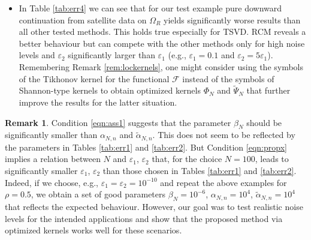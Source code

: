 \documentclass[a4paper, 10pt]{article}
\numberwithin{equation}{section}
\theoremstyle{definition}
\newtheorem{rem}[thm]{Remark}
\newcommand{\eps}{\ensuremath{\varepsilon}}
\begin{document}
\begin{itemize}
\item[(5)] In Table \ref{tab:err4} we can see that for our test example pure downward continuation from satellite data on $\Omega_R$ yields significantly worse results than all other tested methods. This holds true especially for TSVD. RCM reveals a better behaviour but can compete with the other methods only for high noise levels and $\eps_2$  significantly larger than $\eps_1$ (e.g., $\eps_1=0.1$ and $\eps_2=5\eps_1$). Remembering Remark \ref{rem:lockernels}, one might consider using the symbols of the Tikhonov kernel for the functional $\mathcal{F}$ instead of the symbols of Shannon-type kernels to obtain optimized kernels $\Phi_N$ and $\tilde{\Psi}_N$ that further improve the results for the latter situation.
\end{itemize}

\begin{rem}
Condition \eqref{eqn:ass1} suggests that the parameter $\beta_N$ should be significantly smaller than $\alpha_{N,n}$ and $\tilde{\alpha}_{N,n}$. This does not seem to be reflected by the parameters in Tables \ref{tab:err1} and \ref{tab:err2}. But Condition \eqref{eqn:propx} implies a relation between $N$ and $\eps_1$, $\eps_2$ that, for the choice $N=100$, leads to significantly smaller $\eps_1$, $\eps_2$ than those chosen in Tables \ref{tab:err1} and \ref{tab:err2}. Indeed, if we choose, e.g., $\eps_1=\eps_2=10^{-10}$  and repeat the above examples for $\rho=0.5$, we obtain a set of good parameters $\beta_N=10^{-6}$, $\alpha_{N,n}=10^4$, $\tilde{\alpha}_{N,n}=10^4$ that reflects the expected behaviour. However, our goal was to test realistic noise levels for the intended applications and show that the proposed method via optimized kernels works well for these scenarios.
\end{rem}
\end{document}
